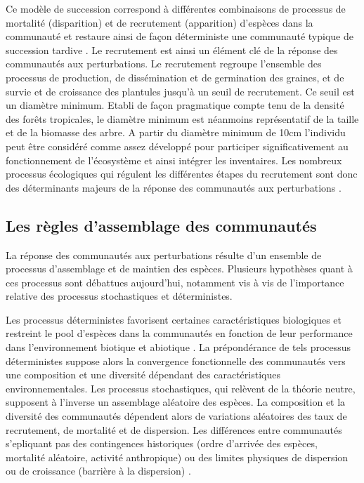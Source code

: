 \documentclass[
  11pt,
  french,
  A4paper,
  extrafontsizes,onecolumn,openright
  ]{memoir}
\begin{document}
Ce modèle de succession correspond à différentes combinaisons de
processus de mortalité (disparition) et de recrutement (apparition)
d'espèces dans la communauté et restaure ainsi de façon déterministe une
communauté typique de succession tardive \autocite{Denslow2000}. Le
recrutement est ainsi un élément clé de la réponse des communautés aux
perturbations. Le recrutement regroupe l'ensemble des processus de
production, de dissémination et de germination des graines, et de survie
et de croissance des plantules jusqu'à un seuil de recrutement. Ce seuil
est un diamètre minimum. Etabli de façon pragmatique compte tenu de la
densité des forêts tropicales, le diamètre minimum est néanmoins
représentatif de la taille et de la biomasse des arbre. A partir du
diamètre minimum de 10cm l'individu peut être considéré comme assez
développé pour participer significativement au fonctionnement de
l'écosystème et ainsi intégrer les inventaires. Les nombreux processus
écologiques qui régulent les différentes étapes du recrutement sont donc
des déterminants majeurs de la réponse des communautés aux perturbations
\autocites{Denslow1980}{Schnitzer2001}{Asner2004}.

\subsection{Les règles d'assemblage des
communautés}\label{les-regles-dassemblage-des-communautes}

La réponse des communautés aux perturbations résulte d'un ensemble de
processus d'assemblage et de maintien des espèces. Plusieurs hypothèses
quant à ces processus sont débattues aujourd'hui, notamment vis à vis de
l'importance relative des processus stochastiques et déterministes.

Les processus déterministes favorisent certaines caractéristiques
biologiques et restreint le pool d'espèces dans la communautés en
fonction de leur performance dans l'environnement biotique et abiotique
\autocite{Molino2001}. La prépondérance de tels processus déterministes
suppose alors la convergence fonctionnelle des communautés vers une
composition et une diversité dépendant des caractéristiques
environnementales. Les processus stochastiques, qui relèvent de la
théorie neutre, supposent à l'inverse un assemblage aléatoire des
espèces. La composition et la diversité des communautés dépendent alors
de variations aléatoires des taux de recrutement, de mortalité et de
dispersion. Les différences entre communautés s'epliquant pas des
contingences historiques (ordre d'arrivée des espèces, mortalité
aléatoire, activité anthropique) ou des limites physiques de dispersion
ou de croissance (barrière à la dispersion)
\autocites{Hubbell2001}{Adler2007}.
\end{document}
